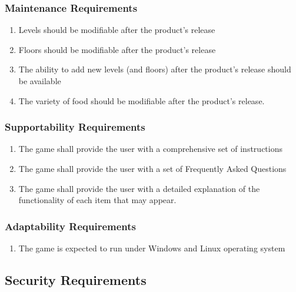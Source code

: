 \documentclass[12pt, titlepage]{article}
\begin{document}
\subsubsection{Maintenance Requirements}
\label{ssub:maintenance_requirements}
\begin{enumerate}[{MS}1. ]
	\item Levels should be modifiable after the product's release
	\item Floors should be modifiable after the product's release
	\item The ability to add new levels (and floors) after the product's release should be available
	\item The variety of food should be modifiable after the product's release.
\end{enumerate}

\subsubsection{Supportability Requirements}
\label{ssub:supportability_requirements}
\begin{enumerate}[start=5,label={ MS\arabic*.}]
	\item The game shall provide the user with a comprehensive set of instructions
	\item The game shall provide the user with a set of Frequently Asked Questions
	\item The game shall provide the user with a detailed explanation of the functionality of each item that may appear.
\end{enumerate}

\subsubsection{Adaptability Requirements}
\label{ssub:adaptability_requirements}
\begin{enumerate}[start=8,label={ MS\arabic*.} ]
	\item The game is expected to run under Windows and Linux operating system
\end{enumerate}


\subsection{Security Requirements}
\label{sub:security_requirements}
\end{document}
